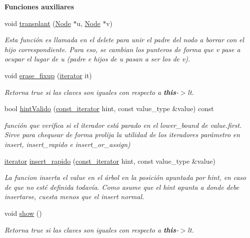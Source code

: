 \begin{Indent}{\bf \-Funciones auxiliares}
\begin{DoxyCompactItemize}
void \hyperlink{classaed2_1_1map_a98b9f200c64ce02dfb67902ee00e375a_a98b9f200c64ce02dfb67902ee00e375a}{transplant} (\hyperlink{structaed2_1_1map_1_1Node}{\-Node} $\ast$u, \hyperlink{structaed2_1_1map_1_1Node}{\-Node} $\ast$v)
\begin{DoxyCompactList}\small\item\em \-Esta función es llamada en el delete para unir el padre del nodo a borrar con el hijo correspondiente. \-Para eso, se cambian los punteros de forma que v pase a ocupar el lugar de u (padre e hijos de u pasan a ser los de v). \end{DoxyCompactList}\item 
void \hyperlink{classaed2_1_1map_a7870c8f26e82b00d0aeb2e9f331dfec6_a7870c8f26e82b00d0aeb2e9f331dfec6}{erase\-\_\-fixup} (\hyperlink{classaed2_1_1map_1_1iterator}{iterator} it)
\begin{DoxyCompactList}\small\item\em \-Retorna true si las claves son iguales con respecto a {\bfseries this}-\/$>$lt. \end{DoxyCompactList}\item 
bool \hyperlink{classaed2_1_1map_a45b04533e9acf27438813ab4a2604443_a45b04533e9acf27438813ab4a2604443}{hint\-Valido} (\hyperlink{classaed2_1_1map_1_1const__iterator}{const\-\_\-iterator} hint, const value\-\_\-type \&value) const 
\begin{DoxyCompactList}\small\item\em función que verifica si el iterador está parado en el lower\-\_\-bound de value.\-first. \-Sirve para chequear de forma prolija la utilidad de los iteradores parámetro en insert, insert\-\_\-rapido e insert\-\_\-or\-\_\-assign) \end{DoxyCompactList}\item 
\hyperlink{classaed2_1_1map_1_1iterator}{iterator} \hyperlink{classaed2_1_1map_a4b4f1e65ee9aeccee4046d53fd5fd8a4_a4b4f1e65ee9aeccee4046d53fd5fd8a4}{insert\-\_\-rapido} (\hyperlink{classaed2_1_1map_1_1const__iterator}{const\-\_\-iterator} hint, const value\-\_\-type \&value)
\begin{DoxyCompactList}\small\item\em \-La funcion inserta el value en el árbol en la posición apuntada por hint, en caso de que no esté definida todavía. \-Como asume que el hint apunta a donde debe insertarse, cuesta menos que el insert normal. \end{DoxyCompactList}\item 
void \hyperlink{classaed2_1_1map_a98aadc6fb2ac8f51567a98473a90c30f_a98aadc6fb2ac8f51567a98473a90c30f}{show} ()
\begin{DoxyCompactList}\small\item\em \-Retorna true si las claves son iguales con respecto a {\bfseries this}-\/$>$lt. \end{DoxyCompactList}\end{DoxyCompactItemize}
\end{Indent}
